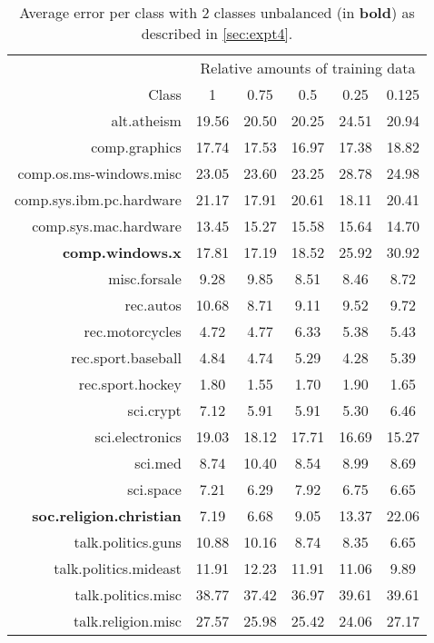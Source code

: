 \begin{table}[h ]
    \centering
    \begin{tabular}{r||c|c|c|c|c}
    \toprule
    & \multicolumn{5}{c}{Relative amounts of training data} \\
    Class &      1 &      0.75 &      0.5 &      0.25 &      0.125 \\
    \midrule
    alt.atheism              &  19.56 &  20.50 &  20.25 &  24.51 &  20.94 \\
    comp.graphics            &  17.74 &  17.53 &  16.97 &  17.38 &  18.82 \\
    comp.os.ms-windows.misc  &  23.05 &  23.60 &  23.25 &  28.78 &  24.98 \\
    comp.sys.ibm.pc.hardware &  21.17 &  17.91 &  20.61 &  18.11 &  20.41 \\
    comp.sys.mac.hardware    &  13.45 &  15.27 &  15.58 &  15.64 &  14.70 \\
    \textbf{comp.windows.x  }         &  17.81 &  17.19 &  18.52 &  25.92 &  30.92 \\
    misc.forsale             &   9.28 &   9.85 &   8.51 &   8.46 &   8.72 \\
    rec.autos                &  10.68 &   8.71 &   9.11 &   9.52 &   9.72 \\
    rec.motorcycles          &   4.72 &   4.77 &   6.33 &   5.38 &   5.43 \\
    rec.sport.baseball       &   4.84 &   4.74 &   5.29 &   4.28 &   5.39 \\
    \hline
    rec.sport.hockey         &   1.80 &   1.55 &   1.70 &   1.90 &   1.65 \\
    sci.crypt                &   7.12 &   5.91 &   5.91 &   5.30 &   6.46 \\
    sci.electronics          &  19.03 &  18.12 &  17.71 &  16.69 &  15.27 \\
    sci.med                  &   8.74 &  10.40 &   8.54 &   8.99 &   8.69 \\
    sci.space                &   7.21 &   6.29 &   7.92 &   6.75 &   6.65 \\
    \textbf{soc.religion.christian}   &   7.19 &   6.68 &   9.05 &  13.37 &  22.06 \\
    talk.politics.guns       &  10.88 &  10.16 &   8.74 &   8.35 &   6.65 \\
    talk.politics.mideast    &  11.91 &  12.23 &  11.91 &  11.06 &   9.89 \\
    talk.politics.misc       &  38.77 &  37.42 &  36.97 &  39.61 &  39.61 \\
    talk.religion.misc       &  27.57 &  25.98 &  25.42 &  24.06 &  27.17 \\
    \bottomrule
    \end{tabular}
    \caption[Class errors with 10 classes unbalanced]{Average error per class with 2 classes unbalanced (in \textbf{bold}) as described in \cref{sec:expt4}.}
\end{table}{}


